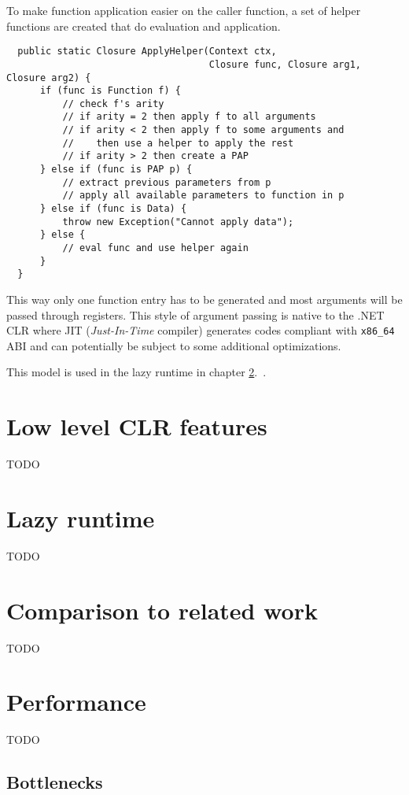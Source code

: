 \documentclass[en]{pracamgr}
\newcommand{\myref}[1]{\ref{#1}.~\nameref{#1}}
\begin{document}
To make function application easier on the caller function, a set of helper functions
are created that do evaluation and application.

\begin{verbatim}
  public static Closure ApplyHelper(Context ctx, 
                                    Closure func, Closure arg1, Closure arg2) {
      if (func is Function f) {
          // check f's arity
          // if arity = 2 then apply f to all arguments
          // if arity < 2 then apply f to some arguments and
          //    then use a helper to apply the rest
          // if arity > 2 then create a PAP
      } else if (func is PAP p) {
          // extract previous parameters from p
          // apply all available parameters to function in p
      } else if (func is Data) {
          throw new Exception("Cannot apply data");
      } else {
          // eval func and use helper again
      }
  }
\end{verbatim}

This way only one function entry has to be generated and most arguments
will be passed through registers. This style of argument passing is
native to the .NET CLR where JIT (\textit{Just-In-Time} compiler) generates
codes compliant with \texttt{x86\_64} ABI and can potentially be subject to
some additional optimizations.

This model is used in the lazy runtime in chapter \myref{r:runtime}.

\chapter{Low level CLR features}\label{r:lowlevel}
TODO

\chapter{Lazy runtime}\label{r:runtime}
TODO

\chapter{Comparison to related work}\label{r:alternatives}
TODO

\chapter{Performance}\label{r:perf}
TODO

\section{Bottlenecks}
\end{document}
